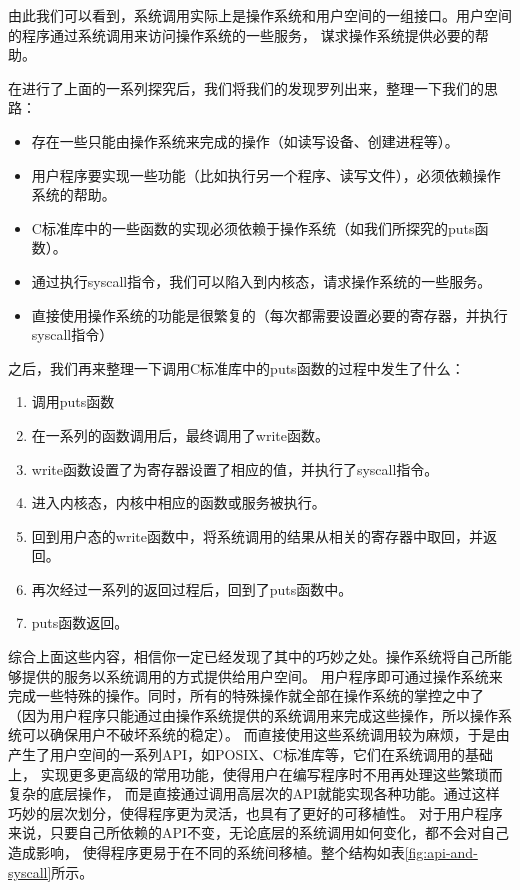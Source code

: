 由此我们可以看到，系统调用实际上是操作系统和用户空间的一组接口。用户空间的程序通过系统调用来访问操作系统的一些服务，
谋求操作系统提供必要的帮助。

在进行了上面的一系列探究后，我们将我们的发现罗列出来，整理一下我们的思路：
\begin{itemize}
  \item 存在一些只能由操作系统来完成的操作（如读写设备、创建进程等）。
  \item 用户程序要实现一些功能（比如执行另一个程序、读写文件），必须依赖操作系统的帮助。
  \item C标准库中的一些函数的实现必须依赖于操作系统（如我们所探究的puts函数）。
  \item 通过执行syscall指令，我们可以陷入到内核态，请求操作系统的一些服务。
  \item 直接使用操作系统的功能是很繁复的（每次都需要设置必要的寄存器，并执行syscall指令）
\end{itemize}

之后，我们再来整理一下调用C标准库中的puts函数的过程中发生了什么：
\begin{enumerate}
  \item 调用puts函数
  \item 在一系列的函数调用后，最终调用了write函数。
  \item write函数设置了为寄存器设置了相应的值，并执行了syscall指令。
  \item 进入内核态，内核中相应的函数或服务被执行。
  \item 回到用户态的write函数中，将系统调用的结果从相关的寄存器中取回，并返回。
  \item 再次经过一系列的返回过程后，回到了puts函数中。
  \item puts函数返回。
\end{enumerate}

综合上面这些内容，相信你一定已经发现了其中的巧妙之处。操作系统将自己所能够提供的服务以系统调用的方式提供给用户空间。
用户程序即可通过操作系统来完成一些特殊的操作。同时，所有的特殊操作就全部在操作系统的掌控之中了
（因为用户程序只能通过由操作系统提供的系统调用来完成这些操作，所以操作系统可以确保用户不破坏系统的稳定）。
而直接使用这些系统调用较为麻烦，于是由产生了用户空间的一系列API，如POSIX、C标准库等，它们在系统调用的基础上，
实现更多更高级的常用功能，使得用户在编写程序时不用再处理这些繁琐而复杂的底层操作，
而是直接通过调用高层次的API就能实现各种功能。通过这样巧妙的层次划分，使得程序更为灵活，也具有了更好的可移植性。
对于用户程序来说，只要自己所依赖的API不变，无论底层的系统调用如何变化，都不会对自己造成影响，
使得程序更易于在不同的系统间移植。整个结构如表\ref{fig:api-and-syscall}所示。


